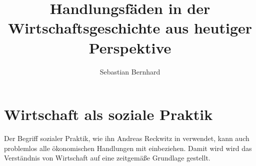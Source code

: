 \documentclass[a4paper]{book}
\begin{document}
\author{Sebastian Bernhard}
\title{Handlungsfäden in der Wirtschaftsgeschichte aus heutiger Perspektive}
\maketitle
\tableofcontents

\section{Wirtschaft als soziale Praktik}

Der Begriff sozialer Praktik, wie ihn Andreas Reckwitz in
\cite{reckwitz2003praktiken} verwendet, kann auch problemlos
alle ökonomischen Handlungen mit einbeziehen. Damit wird
wird das Verständnis von Wirtschaft auf eine zeitgemäße
Grundlage gestellt.









 
\end{document}
